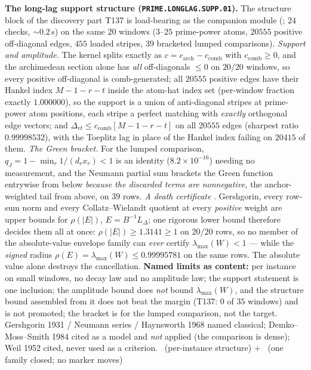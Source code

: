 \par\smallskip\noindent\textbf{The long-lag support structure
(\texttt{PRIME.LONGLAG.SUPP.01}).}
The structure block of the discovery part T137 is load-bearing as the companion
module (; $24$ checks, ${\sim}0.2$\,s) on the
same $20$ windows ($3$--$25$ prime-power atoms, $20555$ positive off-diagonal
edges, $455$ loaded stripes, $39$ bracketed lumped comparisons).
\emph{Support and amplitude.} The kernel splits exactly as
$c=c_{\mathrm{arch}}-c_{\mathrm{comb}}$ with $c_{\mathrm{comb}}\ge0$, and the
archimedean section alone has \emph{all} off-diagonals $\le0$ on $20/20$ windows,
so every positive off-diagonal is comb-generated; all $20555$ positive edges have
their Hankel index $M-1-r-t$ inside the atom-hat index set (per-window fraction
exactly $1.000000$), so the support is a union of anti-diagonal stripes at
prime-power atom positions, each stripe a perfect matching with \emph{exactly}
orthogonal edge vectors; and
$\Delta_{rt}\le c_{\mathrm{comb}}[M-1-r-t]$ on all $20555$ edges (sharpest ratio
$0.99998532$), with the Toeplitz lag in place of the Hankel index failing on
$20415$ of them.
\emph{The Green bracket.} For the lumped comparison, $q_J=1-\min_r1/(d_rx_r)<1$
is an identity ($8.2\times10^{-16}$) needing no measurement, and the Neumann
partial sum brackets the Green function entrywise from below
\emph{because the discarded terms are nonnegative}, the anchor-weighted tail from
above, on $39$ rows.
\emph{A death certificate} \mX. Gershgorin, every row-sum norm and every
Collatz--Wielandt quotient at every \emph{positive} weight are upper bounds for
$\rho(|E|)$, $E=B^{-1}L_\Delta$; one rigorous lower bound therefore decides them
all at once: $\rho(|E|)\ge1.3141\ge1$ on $20/20$ rows, so no member of the
absolute-value envelope family can \emph{ever} certify $\lambda_{\max}(W)<1$ ---
while the \emph{signed} radius $\rho(E)=\lambda_{\max}(W)\le0.99995781$ on the
same rows. The absolute value alone destroys the cancellation.
\textbf{Named limits as content:} per instance on small windows, no decay law and
no amplitude law; the support statement is one inclusion; the amplitude bound
does \emph{not} bound $\lambda_{\max}(W)$, and the structure bound assembled from
it does not beat the margin (T137: $0$ of $35$ windows) and is not promoted; the
bracket is for the lumped comparison, not the target.
Gershgorin 1931 / Neumann series / Haynsworth 1968 named classical;
Demko--Moss--Smith 1984 cited as a model and \emph{not} applied (the comparison is
dense); Weil 1952 cited, never used as a criterion.
\mE\ (per-instance structure) $+$ \mX\ (one family closed; no marker moves)


